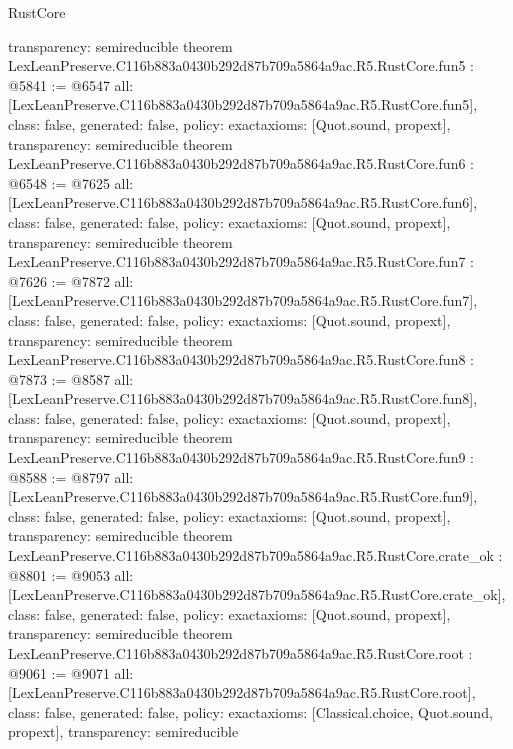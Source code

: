 \begin{lexlean}{RustCore}
\begin{coremodule}
{  transparency: semireducible
}
theorem LexLeanPreserve.C116b883a0430b292d87b709a5864a9ac.R5.RustCore.fun5 : @5841 := @6547 {
  all: [LexLeanPreserve.C116b883a0430b292d87b709a5864a9ac.R5.RustCore.fun5],
  class: false,
  generated: false,
  policy: exact{axioms: [Quot.sound, propext]},
  transparency: semireducible
}
theorem LexLeanPreserve.C116b883a0430b292d87b709a5864a9ac.R5.RustCore.fun6 : @6548 := @7625 {
  all: [LexLeanPreserve.C116b883a0430b292d87b709a5864a9ac.R5.RustCore.fun6],
  class: false,
  generated: false,
  policy: exact{axioms: [Quot.sound, propext]},
  transparency: semireducible
}
theorem LexLeanPreserve.C116b883a0430b292d87b709a5864a9ac.R5.RustCore.fun7 : @7626 := @7872 {
  all: [LexLeanPreserve.C116b883a0430b292d87b709a5864a9ac.R5.RustCore.fun7],
  class: false,
  generated: false,
  policy: exact{axioms: [Quot.sound, propext]},
  transparency: semireducible
}
theorem LexLeanPreserve.C116b883a0430b292d87b709a5864a9ac.R5.RustCore.fun8 : @7873 := @8587 {
  all: [LexLeanPreserve.C116b883a0430b292d87b709a5864a9ac.R5.RustCore.fun8],
  class: false,
  generated: false,
  policy: exact{axioms: [Quot.sound, propext]},
  transparency: semireducible
}
theorem LexLeanPreserve.C116b883a0430b292d87b709a5864a9ac.R5.RustCore.fun9 : @8588 := @8797 {
  all: [LexLeanPreserve.C116b883a0430b292d87b709a5864a9ac.R5.RustCore.fun9],
  class: false,
  generated: false,
  policy: exact{axioms: [Quot.sound, propext]},
  transparency: semireducible
}
theorem LexLeanPreserve.C116b883a0430b292d87b709a5864a9ac.R5.RustCore.crate_ok : @8801 := @9053 {
  all: [LexLeanPreserve.C116b883a0430b292d87b709a5864a9ac.R5.RustCore.crate_ok],
  class: false,
  generated: false,
  policy: exact{axioms: [Quot.sound, propext]},
  transparency: semireducible
}
theorem LexLeanPreserve.C116b883a0430b292d87b709a5864a9ac.R5.RustCore.root : @9061 := @9071 {
  all: [LexLeanPreserve.C116b883a0430b292d87b709a5864a9ac.R5.RustCore.root],
  class: false,
  generated: false,
  policy: exact{axioms: [Classical.choice, Quot.sound, propext]},
  transparency: semireducible
}


\end{coremodule}
\end{lexlean}

